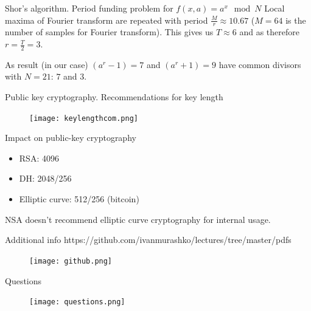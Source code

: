 \documentclass[10pt,pdf,hyperref={unicode}]{beamer}
\begin{document}
\begin{frame}{Shor's algorithm. Period funding problem for
  $f\left(x, a\right) = a^x \mod{N}$}
  Local maxima of Fourier transform are repeated with period
  $\frac{M}{r} \approx 10.67$ ($M = 64$ is the number of samples for
  Fourier transform). This gives us $T\approx 6$ and as therefore
  $r=\frac{T}{2}=3$.

  As result (in our case)
  $(a^r-1) = 7$ and $(a^r + 1) = 9$ have common divisors with
  $N=21$: $7$ and $3$.
\end{frame}


\begin{frame}{Public key cryptography. Recommendations for key length}
 \begin{figure} 
   \texttt{[image: keylengthcom.png]}
  \end{figure}
\end{frame}

\begin{frame}{Impact on public-key cryptography}
\begin{itemize}
\item RSA: 4096
\item DH: 2048/256
\item Elliptic curve: 512/256 (bitcoin) 
\end{itemize}

NSA doesn't recommend elliptic curve cryptography for internal usage.
\end{frame}


\begin{frame}{Additional info}
https://github.com/ivanmurashko/lectures/tree/master/pdfs
 \begin{figure} 
   \texttt{[image: github.png]}
  \end{figure}
\end{frame}

\begin{frame}{Questions}
 \begin{figure} 
   \texttt{[image: questions.png]}
  \end{figure}
\end{frame}
\end{document}
